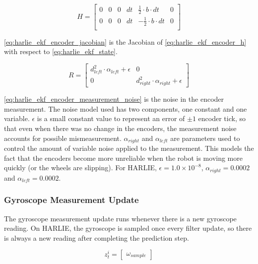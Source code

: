 \begin{equation}
	H =
	\begin{bmatrix}
		0 & 0 & 0 & dt & \frac{1}{2} \cdot b \cdot dt & 0 \\
		0 & 0 & 0 & dt & -\frac{1}{2} \cdot b \cdot dt & 0 \\
	\end{bmatrix}
	\label{eq:harlie_ekf_encoder_jacobian}
\end{equation}

\eqref{eq:harlie_ekf_encoder_jacobian} is the Jacobian of \eqref{eq:harlie_ekf_encoder_h} with respect to \eqref{eq:harlie_ekf_state}.

\begin{equation}
	R =
	\begin{bmatrix}
		d_{left}^2 \cdot \alpha_{left} + \epsilon & 0 \\
		0 & d_{right}^2 \cdot \alpha_{right} + \epsilon
	\end{bmatrix}
	\label{eq:harlie_ekf_encoder_measurement_noise}
\end{equation}

\eqref{eq:harlie_ekf_encoder_measurement_noise} is the noise in the encoder measurement. The noise model used has two components, one constant and one variable. $\epsilon$ is a small constant value to represent an error of $\pm 1$ encoder tick, so that even when there was no change in the encoders, the measurement noise accounts for possible mismeasurement. $\alpha_{right}$ and $\alpha_{left}$ are parameters used to control the amount of variable noise applied to the measurement. This models the fact that the encoders become more unreliable when the robot is moving more quickly (or the wheels are slipping). For HARLIE, $\epsilon = 1.0\times10^{-8}$, $\alpha_{right} = 0.0002$ and $\alpha_{left} = 0.0002$.

\subsubsection{Gyroscope Measurement Update}\label{subsubsec:harlie_ekf_gyro_measurement}

The gyroscope measurement update runs whenever there is a new gyroscope reading. On HARLIE, the gyroscope is sampled once every filter update, so there is always a new reading after completing the prediction step.

\begin{equation}
	z_t^i = 
	\begin{bmatrix}
		\omega_{sample}
	\end{bmatrix}
	\label{eq:harlie_ekf_gyro_z}
\end{equation}

